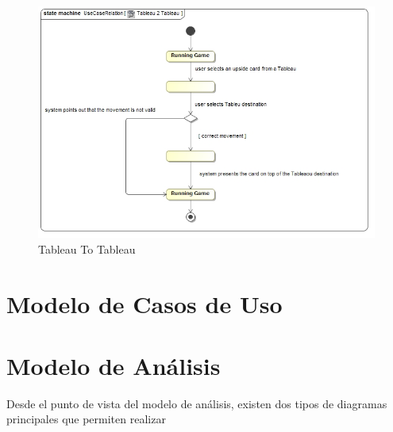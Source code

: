 \documentclass[11pt]{article}
\begin{document}
\begin{center}
 \begin{figure}[H]
 \begin{center}
   \includegraphics[width=14cm]{DomainModel/Tableau2Tableau.jpg}
   \caption{Tableau To Tableau}
   \label{fig:tableau2tableau}
 \end{center}
 \end{figure}
\end{center}

\pagebreak

\section{Modelo de Casos de Uso}

\pagebreak

\section{Modelo de Análisis}



Desde el punto de vista del modelo de análisis, existen dos tipos de diagramas principales que permiten realizar 
\end{document}

